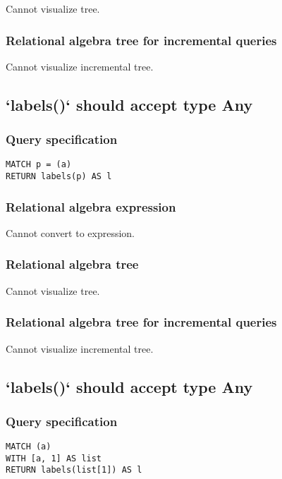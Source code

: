 Cannot visualize tree.

\subsubsection*{Relational algebra tree for incremental queries}

Cannot visualize incremental tree.

\subsection{`labels()` should accept type Any}

\subsubsection*{Query specification}

\begin{lstlisting}
MATCH p = (a)
RETURN labels(p) AS l
\end{lstlisting}

\subsubsection*{Relational algebra expression}

Cannot convert to expression.

\subsubsection*{Relational algebra tree}

Cannot visualize tree.

\subsubsection*{Relational algebra tree for incremental queries}

Cannot visualize incremental tree.

\subsection{`labels()` should accept type Any}

\subsubsection*{Query specification}

\begin{lstlisting}
MATCH (a)
WITH [a, 1] AS list
RETURN labels(list[1]) AS l
\end{lstlisting}

